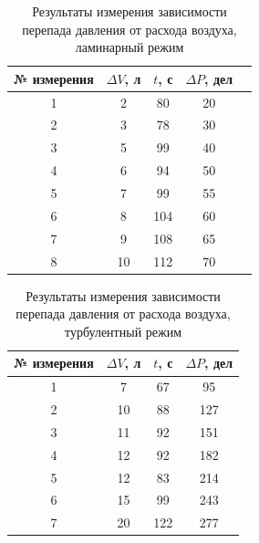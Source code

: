 \documentclass[12pt,a4paper]{article}
\begin{document}
\begin{table}[h!]
\centering
\begin{tabular}{|c|c|c|c|c|}
\hline
№ измерения & $\Delta V$, л & $t$, с & $\Delta P$, дел  \\ \hline
1                         &  2                  & 80      &  20    \\ \hline
2                         &  3                  & 78      &  30     \\ \hline
3                         &  5                  & 99      &  40    \\ \hline
4                         &  6                  & 94      &  50     \\ \hline
5                         &  7                  & 99      &  55    \\ \hline
6                         &  8                  & 104    &  60      \\ \hline
7                         &  9                  & 108    &  65       \\ \hline
8                         &  10                & 112    &  70       \\ \hline
\end{tabular}
\caption{Результаты измерения зависимости перепада давления от расхода воздуха, ламинарный режим}
\label{tab:flow_measuring_laminar}
\end{table}


\begin{table}[h!]
\centering
\begin{tabular}{|c|c|c|c|}
\hline
№ измерения & $\Delta V$, л &  $t$, с & $\Delta P$, дел  \\ \hline
1                         & 7                   & 67      & 95    \\ \hline
2                         & 10                 & 88      & 127    \\ \hline
3                         & 11                 & 92      & 151    \\ \hline
4                         & 12                 & 92      & 182     \\ \hline
5                         & 12                 & 83      & 214    \\ \hline
6                         & 15                 & 99      & 243      \\ \hline
7                         & 20                 & 122    & 277       \\ \hline
\end{tabular}
\caption{Результаты измерения зависимости перепада давления от расхода воздуха, турбулентный режим}
\label{tab:flow_measuring_turbulent}
\end{table}
\end{document}
